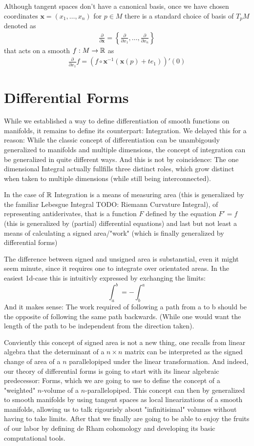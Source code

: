Although tangent spaces don't have a canonical basis, once we have chosen coordinates
$\mathbf{x} = (x_1, \dots, x_n)$ for $p \in M$ there is a standard choice of basis of
$T_pM$ denoted as 
\begin{align*}
	\frac{\partial}{\partial \mathbf{x}} = 
		\left\{\frac{\partial}{\partial x_1}, \dots, \frac{\partial}{\partial x_n}\right\}
\end{align*}
that acts on a smooth $f: M \to \mathbb{R}$ as
\begin{align*}
	\frac{\partial}{\partial x_1} f = (f \circ \mathbf{x}^{-1}(\mathbf{x}(p) + t e_1))'(0)
\end{align*}

\section{Differential Forms}
While we established a way to define differentiation of smooth functions on manifolds,
it remains to define its counterpart: Integration. We delayed this for a reason: While
the classic concept of differentiation can be unambigously generalized to manifolds and
multiple dimensions, the concept of integration can be generalized in quite different ways.
And this is not by coincidence: The one dimensional Integral actually fullfills three distinct roles,
which grow distinct when taken to multiple dimensions (while still being interconnected).

In the case of $\mathbb{R}$ Integration is a means of measuring area (this is generalized by the familiar
Lebesgue Integral TODO: Riemann Curvature Integral), of representing antiderivates, that is
a function $F$ defined by the equation $F' = f$ (this is generalized by (partial) differential
equations) and last but not least a means of calculating a signed area/"work" (which is
finally generalized by differential forms)

The difference between signed and unsigned area is substanstial, even it might seem minute,
since it requires one to integrate over orientated areas. In the easiest 1d-case this is intuitivly
expressed by exchanging the limits:
\[
	\int_a^b = -\int_b^a	
\]
And it makes sense: The work required of following a path from a to b should be the opposite of
following the same path backwards. (While one would want the length of the path to be independent
from the direction taken).

Conviently this concept of signed area is not a new thing, one recalls from linear algebra that
the determinant of a $n \times n$ matrix can be interpreted as the signed change of area of a
$n$ parallelopiped under the linear transformation. And indeed, our theory of differential
forms is going to start with its linear algebraic predecessor: Forms, which we are going
to use to define the concept of a "weighted" $n$-volume of a $n$-parallelopiped. This concept
can then by generalized to smooth manifolds by using tangent spaces as local linearizations
of a smooth manifolds, allowing us to talk rigourisly about "infinitisimal" volumes without
having to take limits. After that we finally are going to be able to enjoy the fruits of our
labor by defining de Rham cohomology and developing its basic computational tools.

